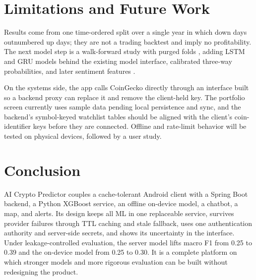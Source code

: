 \documentclass[conference]{IEEEtran}
\begin{document}
\section{Limitations and Future Work}
Results come from one time-ordered split over a single year in which down days outnumbered up days; they are not a trading backtest and imply no profitability. The next model step is a walk-forward study with purged folds \cite{bergmeir2012,lopez2018}, adding LSTM and GRU models \cite{hochreiter1997,cho2014} behind the existing model interface, calibrated three-way probabilities, and later sentiment features \cite{bollen2011}.

On the systems side, the app calls CoinGecko directly through an interface built so a backend proxy can replace it and remove the client-held key. The portfolio screen currently uses sample data pending local persistence and sync, and the backend's symbol-keyed watchlist tables should be aligned with the client's coin-identifier keys before they are connected. Offline and rate-limit behavior will be tested on physical devices, followed by a user study.

\section{Conclusion}
AI Crypto Predictor couples a cache-tolerant Android client with a Spring Boot backend, a Python XGBoost service, an offline on-device model, a chatbot, a map, and alerts. Its design keeps all ML in one replaceable service, survives provider failures through TTL caching and stale fallback, uses one authentication authority and server-side secrets, and shows its uncertainty in the interface. Under leakage-controlled evaluation, the server model lifts macro F1 from 0.25 to 0.39 and the on-device model from 0.25 to 0.30. It is a complete platform on which stronger models and more rigorous evaluation can be built without redesigning the product.
\end{document}

